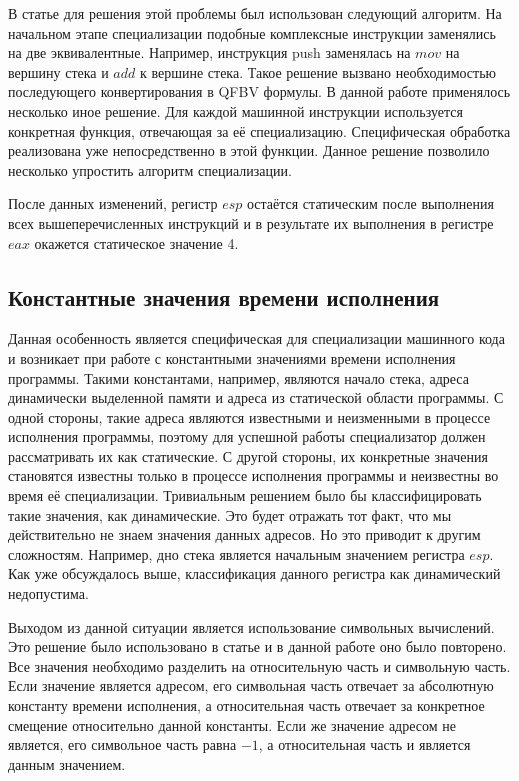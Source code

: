 В статье \cite{PEMC} для решения этой проблемы был использован следующий алгоритм. На начальном этапе специализации подобные комплексные инструкции заменялись на две эквивалентные. Например, инструкция push заменялась на $mov$ на вершину стека и $add$ к вершине стека. Такое решение вызвано необходимостью последующего конвертирования в QFBV формулы. В данной работе применялось несколько иное решение. Для каждой машинной инструкции используется конкретная функция, отвечающая за её специализацию. Специфическая обработка реализована уже непосредственно в этой функции. Данное решение позволило несколько упростить алгоритм специализации.

После данных изменений, регистр $esp$ остаётся статическим после выполнения всех вышеперечисленных инструкций и в результате их выполнения в регистре $eax$ окажется статическое значение 4.

\subsection{ Константные значения времени исполнения}
\label{part:4.3}
Данная особенность является специфическая для специализации машинного кода и возникает при работе с константными значениями времени исполнения программы. Такими константами, например, являются начало стека, адреса динамически выделенной памяти и адреса из статической области программы. С одной стороны, такие адреса являются известными и неизменными в процессе исполнения программы, поэтому для успешной работы специализатор должен рассматривать их как статические. С другой стороны, их конкретные значения становятся известны только в процессе исполнения программы и неизвестны во время её специализации.  Тривиальным решением было бы классифицировать такие значения, как динамические. Это будет отражать тот факт, что мы действительно не знаем значения данных адресов. Но это приводит к другим сложностям. Например, дно стека является начальным значением регистра $esp$. Как уже обсуждалось выше, классификация данного регистра как динамический недопустима. 

Выходом из данной ситуации является использование символьных вычислений. Это решение было использовано в статье \cite{PEMC} и в данной работе оно было повторено. Все значения необходимо разделить на относительную часть и символьную часть. Если значение является адресом, его символьная часть отвечает за абсолютную константу времени исполнения, а относительная часть отвечает за конкретное смещение относительно данной константы. Если же значение адресом не является, его символьное часть равна $-1$, а относительная часть и является данным значением. 

